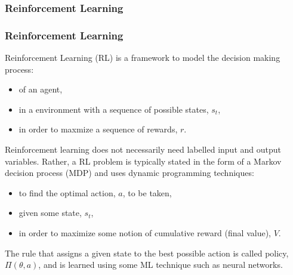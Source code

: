 \documentclass[xcolor=dvipsnames, english, 8pt]{beamer}
\begin{document}
\begin{frame}
    \frametitle{Reinforcement Learning}

\begin{center}
\end{center}
\end{frame}

\begin{frame}
    \frametitle{Reinforcement Learning}
Reinforcement Learning (RL) is a framework to model the {\color{ubRed}decision making process}:\vspace{0.25cm}\\
\begin{itemize}

\item of an {\color{ubRed}agent},
\item in a {\color{ubRed}environment} with a sequence of possible {\color{ubRed}states}, $s_t$,
\item in order to maxmize a sequence of {\color{ubRed}rewards}, $r$.\vspace{0.25cm}\\
\end{itemize}

 Reinforcement learning does not necessarily need labelled input and output variables. Rather, a RL problem is typically stated in the form of a {\color{ubRed}Markov decision process} (MDP) and uses {\color{ubRed}dynamic programming} techniques:\vspace{0.25cm}\\
 \begin{itemize}

 \item  to find the {\color{ubRed}optimal action}, $a$, to be taken,
 \item given some state, $s_t$,
 \item in order to {\color{ubRed}maximize some notion of cumulative reward} (final value), $V$.\vspace{0.25cm}\\
 \end{itemize}  The rule that assigns a given state to the best possible action is called {\color{ubRed}policy}, $\Pi(\theta, a)$, and is learned using some ML technique such as neural networks.
\end{frame}
\end{document}
